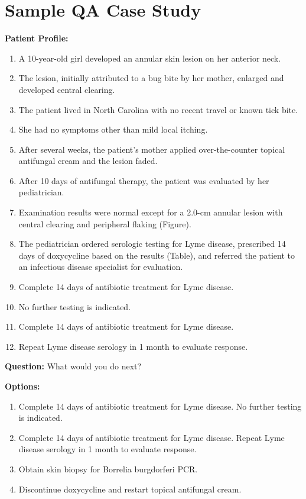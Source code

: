 \documentclass[11pt]{article}
\begin{document}
\section{Sample QA Case Study}
\label{sample}
\begin{tcolorbox}[colback=blue!3!white, colframe=blue!50!white,
                  title=Example of QA Data (from JAMA QA ID1049), left=10mm, breakable]
\small

\textbf{Patient Profile:}
\begin{enumerate}
    \item A 10-year-old girl developed an annular skin lesion on her anterior neck.
    \item The lesion, initially attributed to a bug bite by her mother, enlarged and developed central clearing.
    \item The patient lived in North Carolina with no recent travel or known tick bite.
    \item She had no symptoms other than mild local itching.
    \item After several weeks, the patient's mother applied over-the-counter topical antifungal cream and the lesion faded.
    \item After 10 days of antifungal therapy, the patient was evaluated by her pediatrician.
    \item Examination results were normal except for a 2.0-cm annular lesion with central clearing and peripheral flaking (Figure).
    \item The pediatrician ordered serologic testing for Lyme disease, prescribed 14 days of doxycycline based on the results (Table), and referred the patient to an infectious disease specialist for evaluation.
    \item Complete 14 days of antibiotic treatment for Lyme disease.
    \item No further testing is indicated.
    \item Complete 14 days of antibiotic treatment for Lyme disease.
    \item Repeat Lyme disease serology in 1 month to evaluate response.
\end{enumerate}

\bigskip
\textbf{Question: }What would you do next?

\bigskip
\textbf{Options:}
\begin{enumerate}[label=\Alph*.]
    \item Complete 14 days of antibiotic treatment for Lyme disease. No further testing is indicated.
    \item Complete 14 days of antibiotic treatment for Lyme disease. Repeat Lyme disease serology in 1 month to evaluate response.
    \item Obtain skin biopsy for Borrelia burgdorferi PCR.
    \item Discontinue doxycycline and restart topical antifungal cream.
\end{enumerate}


\end{tcolorbox}
\end{document}
